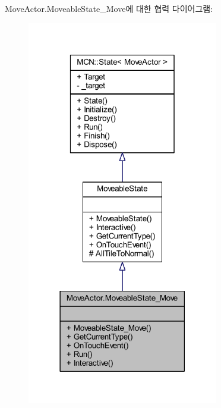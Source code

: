 Move\+Actor.\+Moveable\+State\+\_\+\+Move에 대한 협력 다이어그램\+:\nopagebreak
\begin{figure}[H]
\begin{center}
\leavevmode
\includegraphics[width=237pt]{class_move_actor_1_1_moveable_state___move__coll__graph}
\end{center}
\end{figure}
